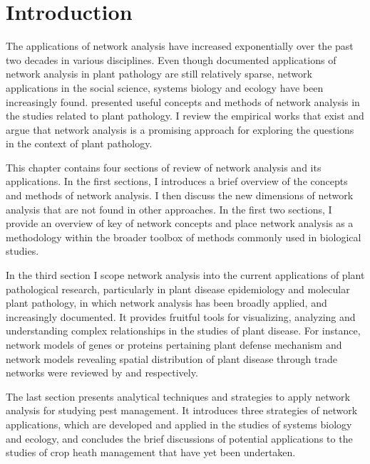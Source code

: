 \section*{Introduction}
\label{ch:intro}

The applications of network analysis have increased exponentially over the past two decades in various disciplines. Even though documented applications of network analysis in plant pathology are still relatively sparse, network applications in the social science, systems biology and ecology have been increasingly found.  presented useful concepts and methods of network analysis in the studies related to plant pathology. I review the empirical works that exist and argue that network analysis is a promising approach for exploring the questions in the context of plant pathology.

This chapter contains four sections of review of network analysis and its applications. In the first sections, I introduces a brief overview of the concepts and methods of network analysis. I then discuss the new dimensions of network analysis that are not found in other approaches. In the first two sections, I provide an overview of key of network concepts and place network analysis as a methodology within the broader toolbox of methods commonly used in biological studies.
  

In the third section I scope network analysis  into the current applications of plant pathological research, particularly in plant disease epidemiology and molecular plant pathology, in which network analysis has been broadly applied, and increasingly documented. It provides fruitful tools for visualizing, analyzing and understanding complex relationships in the studies of plant disease. For instance, network models of genes or proteins pertaining plant defense mechanism and network models revealing spatial distribution of plant disease through trade networks were reviewed by  and  respectively. 

The last section presents analytical techniques and strategies to apply network analysis for studying pest management. It introduces three strategies of network applications, which are developed and applied in the studies of systems biology and ecology, and concludes the brief discussions of potential applications to the studies of crop heath management that have yet been undertaken.

